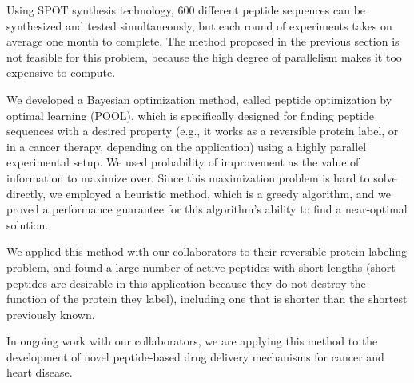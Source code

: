 \documentclass[11pt]{article}
\begin{document}
Using SPOT synthesis technology, 600 different
peptide sequences can be synthesized and tested simultaneously, but each round
of experiments takes on average one month to complete. The method proposed in the
previous section is not feasible for this problem, because the high degree of parallelism makes it too expensive to compute.

We developed a Bayesian optimization method, called peptide optimization by optimal learning (POOL),
which is specifically designed for finding peptide sequences with a desired property (e.g., it works as a reversible protein label, or in a cancer therapy, depending on the application) using a highly parallel experimental setup. We used probability of
improvement as the value of information to maximize over. Since this maximization
problem is hard to solve directly, we employed a heuristic method, which is
a greedy algorithm, and we proved a performance guarantee
for this algorithm's ability to find a near-optimal solution. 


We applied this method with our collaborators to their reversible protein labeling problem, and found a large number of active peptides with short lengths (short peptides are desirable in this application because they do not destroy the function of the protein they label), including one that is shorter than the shortest previously known.

In ongoing work with our collaborators, we are applying this method to the development of novel peptide-based drug delivery mechanisms for cancer and heart disease.


\end{document}
